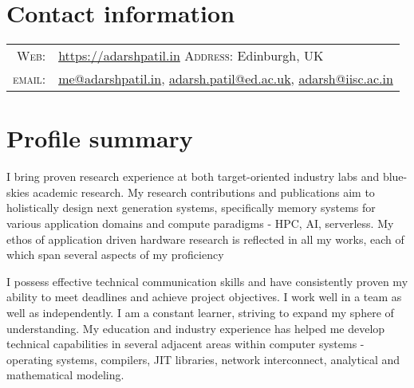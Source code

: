 \documentclass[a4paper,10pt]{article} %
\begin{document}
\pagestyle{empty} %



\par{\bigskip\par} %

\section{Contact information}

\begin{tabular}{rl}
\textsc{Web:} & \href{https://adarshpatil.in/timewarp}{https://adarshpatil.in} \hspace{2cm} \textsc{Address:} Edinburgh, UK\\
\textsc{email:} & \href{mailto:me@adarshpatil.in}{me@adarshpatil.in}, \href{mailto:adarsh.patil@ed.ac.uk}{adarsh.patil@ed.ac.uk}, \href{mailto:adarsh@iisc.ac.in}{adarsh@iisc.ac.in}\\
\end{tabular}

\section{Profile summary}
I bring proven research experience at both target-oriented industry labs and blue-skies academic research.
My research contributions and publications aim to holistically design next generation systems, specifically memory systems for various application domains and compute paradigms - HPC, AI, serverless.
My ethos of application driven hardware research is reflected in all my works, each of which span several aspects of my proficiency

I possess effective technical communication skills and have consistently proven my ability to meet deadlines and achieve project objectives. I work well in a team as well as independently. I am a constant learner, striving to expand my sphere of understanding. My education and industry experience has helped me develop technical capabilities in several adjacent areas within computer systems - operating systems, compilers, JIT libraries, network interconnect, analytical and mathematical modeling. 
\end{document}
